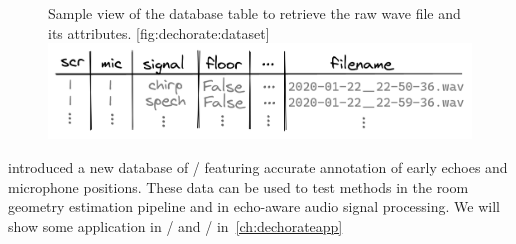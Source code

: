 \begin{figure}
    \begin{sidecaption}[]{
            Sample view of the database table to retrieve the raw wave file and its attributes.
        }[fig:dechorate:dataset]
        \centering
        \includegraphics[width=\linewidth]{figures/dechorate/database.png}
    \end{sidecaption}
\end{figure}

 introduced a new database of \RIRdef/ featuring accurate annotation of early echoes and microphone positions.
These data can be used to test methods in the room geometry estimation pipeline and in echo-aware audio signal processing.
We will show some application in \SE/ and \RooGE/ in~\cref{ch:dechorateapp}